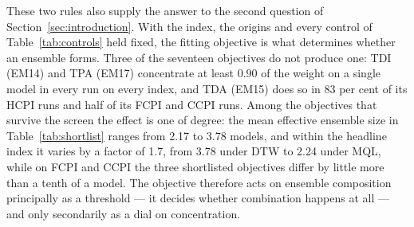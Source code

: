 \documentclass[12pt]{article}
\begin{document}
These two rules also supply the answer to the second question of
Section~\ref{sec:introduction}. With the index, the origins and every control
of Table~\ref{tab:controls} held fixed, the fitting objective is what
determines whether an ensemble forms. Three of the seventeen objectives do not
produce one: TDI (EM14) and TPA (EM17) concentrate at least $0.90$ of the
weight on a single model in every run on every index, and TDA (EM15) does so in
83 per cent of its HCPI runs and half of its FCPI and CCPI runs. Among the
objectives that survive the screen the effect is one of degree: the mean
effective ensemble size in Table~\ref{tab:shortlist} ranges from 2.17 to 3.78
models, and within the headline index it varies by a factor of 1.7, from 3.78
under DTW to 2.24 under MQL, while on FCPI and CCPI the three shortlisted
objectives differ by little more than a tenth of a model. The objective therefore acts on
ensemble composition principally as a threshold --- it decides whether
combination happens at all --- and only secondarily as a dial on concentration.
\end{document}
